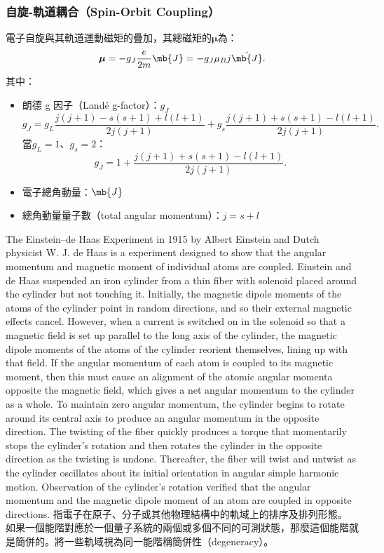 \documentclass[a4paper,12pt]{report}
\begin{document}
\subsubsection{自旋-軌道耦合（Spin-Orbit Coupling）}
電子自旋與其軌道運動磁矩的疊加，其總磁矩的$\boldsymbol{\mu}$為：
\[\boldsymbol{\mu}=-g_J\frac{e}{2m}\mb{J}=-g_J\mu_Bj\hat{\mb{J}}.\]
其中：
\begin{itemize}
\item 朗德 g 因子（Landé g-factor）：$g_J$
\[g_J=g_L\frac{j(j+1)-s(s+1)+l(l+1)}{2j(j+1)}+g_s\frac{j(j+1)+s(s+1)-l(l+1)}{2j(j+1)}.\]
當$g_L=1$、$g_s=2$：
\[g_J=1+\frac{j(j+1)+s(s+1)-l(l+1)}{2j(j+1)}.\]
\item 電子總角動量：$\mb{J}$
\item 總角動量量子數（total angular momentum）：$j=s+l$
\end{itemize}
The Einstein–de Haas Experiment in 1915 by Albert Einstein and Dutch physicist W. J. de Haas is a experiment designed to show that the angular momentum and magnetic moment of individual atoms are coupled. Einstein and de Haas suspended an iron cylinder from a thin fiber with solenoid placed around the cylinder but not touching it. Initially, the magnetic dipole moments of the atoms of the cylinder point in random directions, and so their external magnetic effects cancel. However, when a current is switched on in the solenoid so that a magnetic field is set up parallel to the long axis of the cylinder, the magnetic dipole moments of the atoms of the cylinder reorient themselves, lining up with that field. If the angular momentum of each atom is coupled to its magnetic moment, then this must cause an alignment of the atomic angular momenta opposite the magnetic field, which gives a net angular momentum to the cylinder as a whole. To maintain zero angular momentum, the cylinder begins to rotate around its central axis to produce an angular momentum in the opposite direction. The twisting of the fiber quickly produces a torque that momentarily stops the cylinder's rotation and then rotates the cylinder in the opposite direction as the twisting is undone. Thereafter, the fiber will twist and untwist as the cylinder oscillates about its initial orientation in angular simple harmonic motion. Observation of the cylinder's rotation verified that the angular momentum and the magnetic dipole moment of an atom are coupled in opposite directions.
指電子在原子、分子或其他物理結構中的軌域上的排序及排列形態。 
如果一個能階對應於一個量子系統的兩個或多個不同的可測狀態，那麼這個能階就是簡併的。將一些軌域視為同一能階稱簡併性（degeneracy）。
\end{document}
